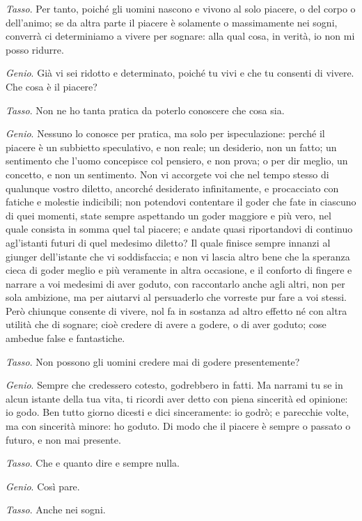 \emph{Tasso}. Per tanto, poiché gli uomini nascono e vivono al solo piacere, o del corpo o dell'animo; se da altra parte il piacere è solamente o massimamente nei sogni, converrà ci determiniamo a vivere per sognare: alla qual cosa, in verità, io non mi posso ridurre.

\emph{Genio}. Già vi sei ridotto e determinato, poiché tu vivi e che tu consenti di vivere. Che cosa è il piacere?

\emph{Tasso}. Non ne ho tanta pratica da poterlo conoscere che cosa sia.

\emph{Genio}. Nessuno lo conosce per pratica, ma solo per ispeculazione: perché il piacere è un subbietto speculativo, e non reale; un desiderio, non un fatto; un sentimento che l'uomo concepisce col pensiero, e non prova; o per dir meglio, un concetto, e non un sentimento. Non vi accorgete voi che nel tempo stesso di qualunque vostro diletto, ancorché desiderato infinitamente, e procacciato con fatiche e molestie indicibili; non potendovi contentare il goder che fate in ciascuno di quei momenti, state sempre aspettando un goder maggiore e più vero, nel quale consista in somma quel tal piacere; e andate quasi riportandovi di continuo agl'istanti futuri di quel medesimo diletto? Il quale finisce sempre innanzi al giunger dell'istante che vi soddisfaccia; e non vi lascia altro bene che la speranza cieca di goder meglio e più veramente in altra occasione, e il conforto di fingere e narrare a voi medesimi di aver goduto, con raccontarlo anche agli altri, non per sola ambizione, ma per aiutarvi al persuaderlo che vorreste pur fare a voi stessi. Però chiunque consente di vivere, nol fa in sostanza ad altro effetto né con altra utilità che di sognare; cioè credere di avere a godere, o di aver goduto; cose ambedue false e fantastiche.

\emph{Tasso}. Non possono gli uomini credere mai di godere presentemente?

\emph{Genio}. Sempre che credessero cotesto, godrebbero in fatti. Ma narrami tu se in alcun istante della tua vita, ti ricordi aver detto con piena sincerità ed opinione: io godo. Ben tutto giorno dicesti e dici sinceramente: io godrò; e parecchie volte, ma con sincerità minore: ho goduto. Di modo che il piacere è sempre o passato o futuro, e non mai presente.

\emph{Tasso}. Che e quanto dire e sempre nulla.

\emph{Genio}. Così pare.

\emph{Tasso}. Anche nei sogni.

